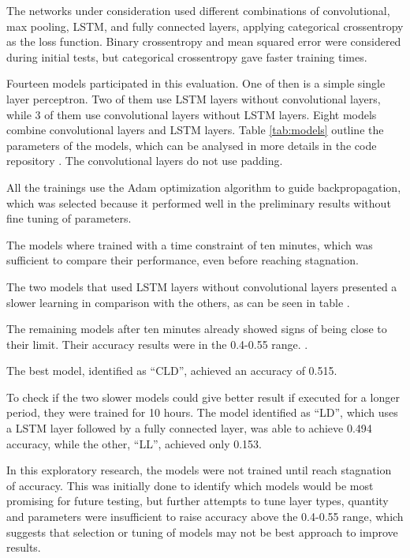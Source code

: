 The networks under consideration used different combinations of convolutional, max pooling, LSTM, and fully connected layers,
applying categorical crossentropy as the loss function. Binary crossentropy and mean squared error were considered during initial tests, but categorical crossentropy gave faster training times.

Fourteen models participated in this evaluation. One of then is a simple single layer perceptron. Two of them use LSTM layers without convolutional layers, while 3 of them use convolutional layers without LSTM layers. Eight models combine convolutional layers and LSTM layers. Table \ref{tab:models} outline the parameters of the models, which can be analysed in more details in the code repository . The convolutional layers do not use padding. 



All the trainings use the Adam \cite{kingma_adam:_2014}
optimization algorithm to guide backpropagation, which was selected because it performed well in the preliminary results without fine tuning of parameters.

The models where trained with a time constraint of ten minutes, which was sufficient to compare their performance, even before reaching stagnation.

The two models that used LSTM layers without convolutional layers presented a slower learning in comparison with the others, as can be seen in table .

The remaining models after ten minutes already showed signs of being close to their limit.
Their accuracy results were in the 0.4-0.55 range. .

The best model, identified as ``CLD'', achieved an accuracy of 0.515.

To check if the two slower models could give better result if executed for a longer period, they were trained for 10 hours. The model identified as ``LD'', which uses a LSTM layer followed by a fully connected layer, was able to achieve 0.494 accuracy, while the other, ``LL'', achieved only 0.153.




In this exploratory research, the models were not trained until reach stagnation of accuracy. This was initially done to identify which models would be most promising for future testing, but further attempts to tune layer types, quantity and parameters were insufficient to raise accuracy above the 0.4-0.55 range, which suggests that selection or tuning of models may not be best approach to improve results.



